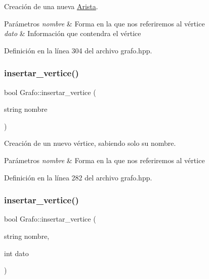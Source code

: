 Creación de una nueva \hyperlink{classArista}{Arista}. 


\begin{DoxyParams}{Parámetros}
{\em nombre} & Forma en la que nos referiremos al vértice \\
\hline
{\em dato} & Información que contendra el vértice \\
\hline
\end{DoxyParams}


Definición en la línea 304 del archivo grafo.\+hpp.

\mbox{\label{classGrafo_ade13f10eecc05a5a08ef43c26b53e248}} 
\subsubsection{\texorpdfstring{insertar\+\_\+vertice()}{insertar\_vertice()}\hspace{0.1cm}{\footnotesize\ttfamily [1/2]}}
{\footnotesize\ttfamily bool Grafo\+::insertar\+\_\+vertice (\begin{DoxyParamCaption}\item[{string}]{nombre }\end{DoxyParamCaption})}



Creación de un nuevo vértice, sabiendo solo su nombre. 


\begin{DoxyParams}{Parámetros}
{\em nombre} & Forma en la que nos referiremos al vértice \\
\hline
\end{DoxyParams}


Definición en la línea 282 del archivo grafo.\+hpp.

\mbox{\label{classGrafo_a45450097c4398a0539689245784adf4a}} 
\subsubsection{\texorpdfstring{insertar\+\_\+vertice()}{insertar\_vertice()}\hspace{0.1cm}{\footnotesize\ttfamily [2/2]}}
{\footnotesize\ttfamily bool Grafo\+::insertar\+\_\+vertice (\begin{DoxyParamCaption}\item[{string}]{nombre,  }\item[{int}]{dato }\end{DoxyParamCaption})}




